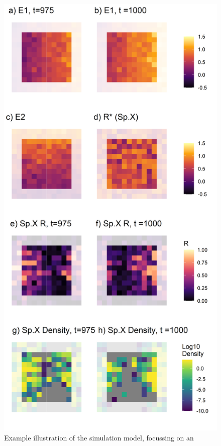 \documentclass[
]{article}
\begin{document}
\begin{figure}
\centering
\includegraphics[width=\textwidth,height=0.65\textheight]{SimulationMarkdowns/Figures/SimulationExample_grid.png}
\caption{Example illustration of the simulation model, focussing on an
}
\end{figure}
\end{document}

